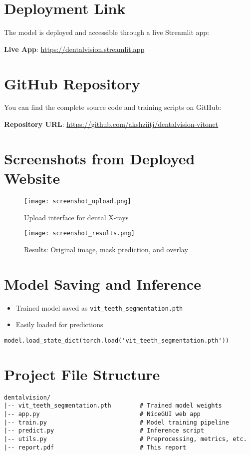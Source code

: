 \documentclass[12pt]{article}
\begin{document}
\section{Deployment Link}
The model is deployed and accessible through a live Streamlit app:

\textbf{Live App}: \url{https://dentalvision.streamlit.app}

\section{GitHub Repository}
You can find the complete source code and training scripts on GitHub:

\textbf{Repository URL}: \url{https://github.com/akshziitj/dentalvision-vitonet}

\section{Screenshots from Deployed Website}

\begin{figure}[H]
\centering
\texttt{[image: screenshot\_upload.png]}
\caption{Upload interface for dental X-rays}
\end{figure}

\begin{figure}[H]
\centering
\texttt{[image: screenshot\_results.png]}
\caption{Results: Original image, mask prediction, and overlay}
\end{figure}

\section{Model Saving and Inference}
\begin{itemize}
  \item Trained model saved as \texttt{vit\_teeth\_segmentation.pth}
  \item Easily loaded for predictions
\end{itemize}

\begin{verbatim}
model.load_state_dict(torch.load('vit_teeth_segmentation.pth'))
\end{verbatim}

\section{Project File Structure}
\begin{Verbatim}[fontsize=\small]
dentalvision/
|-- vit_teeth_segmentation.pth        # Trained model weights
|-- app.py                            # NiceGUI web app
|-- train.py                          # Model training pipeline
|-- predict.py                        # Inference script
|-- utils.py                          # Preprocessing, metrics, etc.
|-- report.pdf                        # This report
\end{Verbatim}
\end{document}
